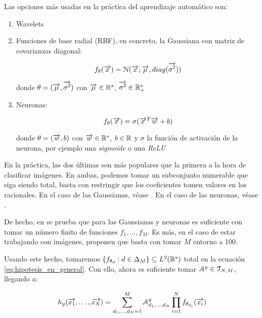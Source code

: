 Las opciones más usadas en la práctica del aprendizaje automático son:

\begin{enumerate}
	\item Wavelets
	\item Funciones de base radial (RBF), en concreto, la Gaussiana con matriz de covarianzas diagonal:

	      \begin{equation}
		      f_\theta(\overrightarrow{x}) = \mathcal{N}(\overrightarrow{x}; \overrightarrow{\mu}, diag(\overrightarrow{\sigma^2}))
	      \end{equation}

	      donde $\theta = (\overrightarrow{\mu}, \overrightarrow{\sigma^2})$ con $\overrightarrow{\mu} \in \mathbb{R}^s$, $\overrightarrow{\sigma^2} \in \mathbb{R}^s_+$

	\item Neuronas:

	      \begin{equation}
		      f_\theta(\overrightarrow{x}) = \sigma(\overrightarrow{x}^T \overrightarrow{w} + b)
	      \end{equation}

	      donde $\theta = (\overrightarrow{w}, b)$ con $\overrightarrow{w} \in \mathbb{R}^s$, $b \in \mathbb{R}$ y $\sigma$ la función de activación de la neurona, por ejemplo una \textit{sigmoide} o una \textit{ReLU}


\end{enumerate}

En la práctica, las dos últimas son más populares que la primera a la hora de clasificar imágenes. En ambas, podemos tomar un subconjunto numerable que siga siendo total, basta con restringir que los coeficientes tomen valores en los racionales. En el caso de las Gaussianas, véase \cite{matematicas:gaussianas_totales}. En el caso de las neuronas, véase \cite{matematicas:neuronas_totales}.

De hecho, en \cite{matematicas:principal} se prueba que para las Gaussianas y neuronas es suficiente con tomar un número finito de funciones ${f_1, \ldots, f_M}$. Es más, en el caso de estar trabajando con imágenes, proponen que basta con tomar $M$ entorno a 100.

Usando este hecho, tomaremos $\{f_{\theta_d}: d \in \Delta_{M}\} \subseteq L^2(\mathbb{R}^s)$ total en la ecuación \eqref{eq:hipotesis_en_general}. Con ello, ahora es suficiente tomar $\mathcal{A}^y \in \mathcal{T}_{N, M}$, llegando a:

\begin{equation}
	h_y(\overrightarrow{x_1}, \ldots, \overrightarrow{x_N}) = \sum_{d_1, \ldots, d_N = 1}^{M} \mathcal{A}^y_{d_1, \ldots, d_N} \prod_{i = 1}^N f_{\theta_{d_i}}(\overrightarrow{x_i})
\end{equation}

